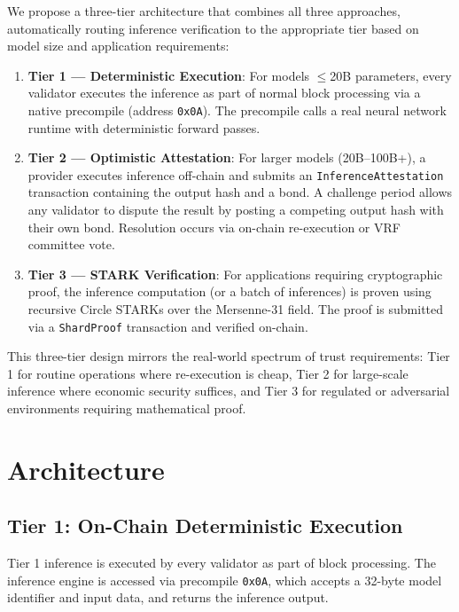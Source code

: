\documentclass[conference]{IEEEtran}
\begin{document}
We propose a three-tier architecture that combines all three approaches, automatically routing inference verification to the appropriate tier based on model size and application requirements:

\begin{enumerate}
    \item \textbf{Tier 1 --- Deterministic Execution}: For models $\leq$20B parameters, every validator executes the inference as part of normal block processing via a native precompile (address \texttt{0x0A}). The precompile calls a real neural network runtime with deterministic forward passes.

    \item \textbf{Tier 2 --- Optimistic Attestation}: For larger models (20B--100B+), a provider executes inference off-chain and submits an \texttt{InferenceAttestation} transaction containing the output hash and a bond. A challenge period allows any validator to dispute the result by posting a competing output hash with their own bond. Resolution occurs via on-chain re-execution or VRF committee vote.

    \item \textbf{Tier 3 --- STARK Verification}: For applications requiring cryptographic proof, the inference computation (or a batch of inferences) is proven using recursive Circle STARKs over the Mersenne-31 field. The proof is submitted via a \texttt{ShardProof} transaction and verified on-chain.
\end{enumerate}

This three-tier design mirrors the real-world spectrum of trust requirements: Tier 1 for routine operations where re-execution is cheap, Tier 2 for large-scale inference where economic security suffices, and Tier 3 for regulated or adversarial environments requiring mathematical proof.

\section{Architecture}

\subsection{Tier 1: On-Chain Deterministic Execution}

Tier 1 inference is executed by every validator as part of block processing. The inference engine is accessed via precompile \texttt{0x0A}, which accepts a 32-byte model identifier and input data, and returns the inference output.
\end{document}
